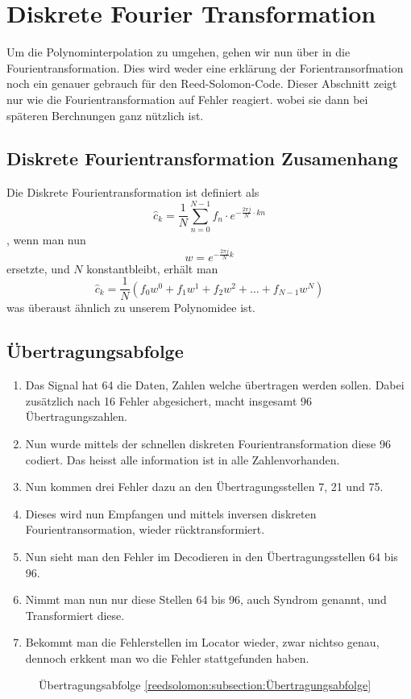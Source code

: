 %
%
%
\section{Diskrete Fourier Transformation
\label{reedsolomon:section:dtf}}
Um die Polynominterpolation zu umgehen, gehen wir nun über in die Fourientransformation.
Dies wird weder eine erklärung der Forientransorfmation noch ein genauer gebrauch
für den Reed-Solomon-Code. Dieser Abschnitt zeigt nur wie die Fourientransformation auf Fehler reagiert.
wobei sie dann bei späteren Berchnungen ganz nützlich ist.

\subsection{Diskrete Fourientransformation Zusamenhang
\label{reedsolomon:subsection:dtfzusamenhang}}
Die Diskrete Fourientransformation ist definiert als
	\[
	\label{ft_discrete}
	\hat{c}_{k} 
	= \frac{1}{N} \sum_{n=0}^{N-1}
	{f}_n \cdot e^{-\frac{2\pi j}{N} \cdot kn}
	\]
, wenn man nun 
	\[
	w = e^{-\frac{2\pi j}{N} k}
	\]
ersetzte, und $N$ konstantbleibt, erhält man
	\[
	\hat{c}_{k}=\frac{1}{N}( {f}_0 w^0 + {f}_1 w^1 + {f}_2 w^2 + \dots + {f}_{N-1} w^N)
	\]
was überaust ähnlich zu unserem Polynomidee ist.
\subsection{Übertragungsabfolge
\label{reedsolomon:subsection:Übertragungsabfolge}}

\begin{enumerate}[1)]
\item Das Signal hat 64 die Daten, Zahlen welche übertragen werden sollen. 
Dabei zusätzlich nach 16 Fehler abgesichert, macht insgesamt 96 Übertragungszahlen.
\item Nun wurde mittels der schnellen diskreten Fourientransformation diese 96 codiert.
Das heisst alle information ist in alle Zahlenvorhanden.
\item Nun kommen drei Fehler dazu an den Übertragungsstellen 7, 21 und 75.
\item Dieses wird nun Empfangen und mittels inversen diskreten Fourientransormation, wieder rücktransformiert.
\item Nun sieht man den Fehler im Decodieren in den Übertragungsstellen 64 bis 96.
\item Nimmt man nun nur diese Stellen 64 bis 96, auch Syndrom genannt, und Transformiert diese.
\item Bekommt man die Fehlerstellen im Locator wieder, zwar nichtso genau, dennoch erkkent man wo die Fehler stattgefunden haben.
\end{enumerate}

\begin{figure}
	\centering
	\resizebox{0.9\textwidth}{!}{
    
	}
	\caption{Übertragungsabfolge \ref{reedsolomon:subsection:Übertragungsabfolge}}
	\label{fig:sendorder}
\end{figure}